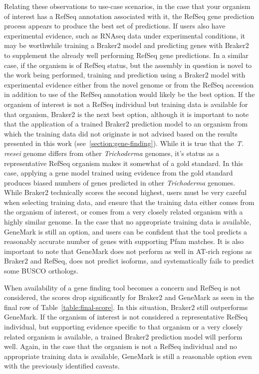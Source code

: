 Relating these observations to use-case scenarios, in the case that
your organism of interest has a RefSeq annotation associated with it,
the RefSeq gene prediction process appears to produce the best set of
predictions. If users also have experimental evidence, such as RNAseq
data under experimental conditions, it may be worthwhile training a
Braker2 model and predicting genes with Braker2 to supplement the
already well performing RefSeq gene predictions. In a similar case, if
the organism is of RefSeq status, but the assembly in question is
novel to the work being performed, training and prediction using a
Braker2 model with experimental evidence either from the novel genome
or from the RefSeq accession in addition to use of the RefSeq
annotation would likely be the best option. If the organism of
interest is not a RefSeq individual but training data is available for
that organism, Braker2 is the next best option, although it is
important to note that the application of a trained Braker2 prediction
model to an organism from which the training data did not originate is
not advised based on the results presented in this work (see~\ref{section:gene-finding}). While it is true that the
\textit{T. reesei} genome differs from other \textit{Trichoderma}
genomes, it's status as a representative RefSeq organism makes it
somewhat of a gold standard. In this case, applying a gene model
trained using evidence from the gold standard produces biased numbers
of genes predicted in other \textit{Trichoderma} genomes. While
Braker2 technically scores the second highest, users must be very
careful when selecting training data, and ensure that the training
data either comes from the organism of interest, or comes from a very
closely related organism with a highly similar genome. In the case
that no appropriate training data is available, GeneMark is still an
option, and users can be confident that the tool predicts a reasonably
accurate number of genes with supporting Pfam matches. It is also
important to note that GeneMark does not perform as well in AT-rich
regions as Braker2 and RefSeq, does not predict isoforms, and
systematically fails to predict some BUSCO orthologs.

When availability of a gene finding tool becomes a concern and RefSeq
is not considered, the scores drop significantly for Braker2 and
GeneMark as seen in the final row of Table~\ref{table:final-score}. In
this situation, Braker2 still outperforms GeneMark. If the organism of
interest is not considered a representative RefSeq individual, but
supporting evidence specific to that organism or a very closely
related organism is available, a trained Braker2 prediction model will
perform well. Again, in the case that the organism is not a RefSeq
individual and no appropriate training data is available, GeneMark is
still a reasonable option even with the previously identified caveats.

